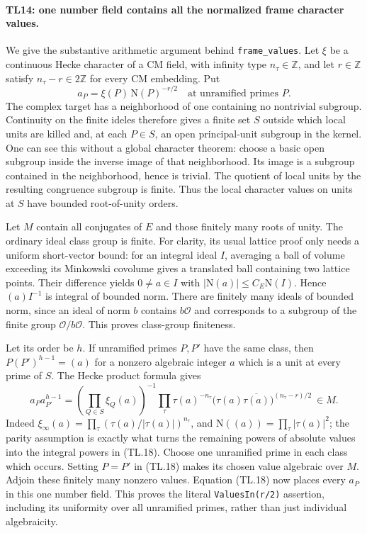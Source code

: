 \documentclass[11pt,a4paper]{article}
\numberwithin{equation}{section}
\theoremstyle{remark}\newtheorem{remark}[theorem]{Remark}
\begin{document}
\paragraph{TL14: one number field contains all the normalized frame
character values.}
We give the substantive arithmetic argument behind
\texttt{frame\_\allowbreak values}. Let $\xi$ be a continuous Hecke character
of a CM field, with infinity type $n_\tau\in\mathbb Z$, and let
$r\in\mathbb Z$ satisfy $n_\tau-r\in2\mathbb Z$ for every CM
embedding. Put
\[
 a_P=\xi(P)\,\mathrm N(P)^{-r/2}
 \quad\text{at unramified primes }P.              \tag{TL.17}
\]
The complex target has a neighborhood of one containing no
nontrivial subgroup. Continuity on the finite ideles therefore
gives a finite set $S$ outside which local units are killed and,
at each $P\in S$, an open principal-unit subgroup in the kernel.
One can see this without a global character theorem: choose a
basic open subgroup inside the inverse image of that neighborhood.
Its image is a subgroup contained in the neighborhood, hence is
trivial. The quotient of local units by the resulting congruence
subgroup is finite. Thus the local character values on units at
$S$ have bounded root-of-unity orders.

Let $M$ contain all conjugates of $E$ and those finitely many roots
of unity. The ordinary ideal class group is finite. For clarity,
its usual lattice proof only needs a uniform short-vector bound:
for an integral ideal $I$, averaging a ball of volume exceeding
its Minkowski covolume gives a translated ball containing two
lattice points. Their difference yields $0\ne a\in I$ with
$|\mathrm N(a)|\le C_E\mathrm N(I)$. Hence
$(a)I^{-1}$ is integral of bounded norm. There are finitely many
ideals of bounded norm, since an ideal of norm $b$ contains
$b\mathcal O$ and corresponds to a subgroup of the finite group
$\mathcal O/b\mathcal O$. This proves class-group finiteness.

Let its order be $h$. If unramified primes $P,P'$ have the same
class, then $P(P')^{h-1}=(a)$ for a nonzero algebraic integer $a$ which is
a unit at every prime of $S$. The Hecke product formula gives
\[
 a_Pa_{P'}^{h-1}
  =\left(\prod_{Q\in S}\xi_Q(a)\right)^{-1}
    \prod_\tau \tau(a)^{-n_\tau}
       \bigl(\tau(a)\overline{\tau(a)}\bigr)^{(n_\tau-r)/2}
  \ \in M.                                         \tag{TL.18}
\]
Indeed $\xi_\infty(a)=\prod_\tau(\tau(a)/|\tau(a)|)^{n_\tau}$,
and $\mathrm N((a))=\prod_\tau|\tau(a)|^2$; the parity assumption
is exactly what turns the remaining powers of absolute values
into the integral powers in (TL.18).
Choose one unramified prime in each class which occurs. Setting
$P=P'$ in (TL.18) makes its chosen value algebraic over $M$.
Adjoin these finitely many nonzero values. Equation (TL.18) now
places every $a_P$ in this one number field. This proves the
literal \texttt{ValuesIn(r/2)} assertion, including its uniformity
over all unramified primes, rather than just individual
algebraicity.
\end{document}

